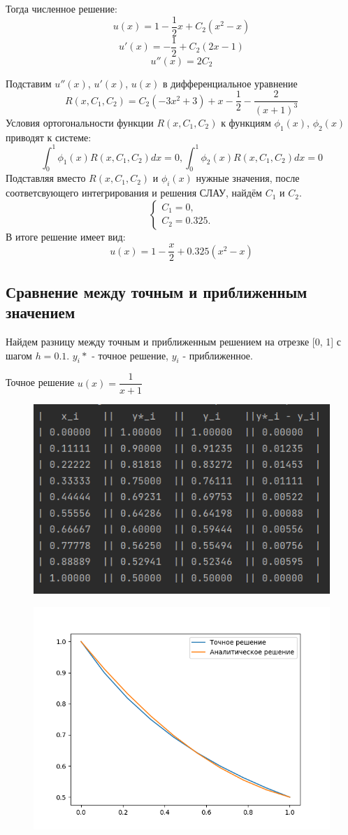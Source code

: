 \documentclass[a4paper, 14pt, fleqn]{extarticle}
\begin{document}
				Тогда численное решение: 
				\[ u(x) = 1 - \dfrac{1}{2}x + C_2(x^2-x) \]
				\[u'(x) = -\dfrac{1}{2} + C_2(2x-1) \]
				\[u''(x) = 2C_2\]
				
				Подставим $u''(x)$, $u'(x)$, $u(x)$ в дифференциальное уравнение
				\[ R(x, C_1, C_2) = C_2(-3x^2+3) + x - \dfrac{1}{2} - \dfrac{2}{(x+1)^3} \]
				Условия ортогональности функции $R(x, C_1, C_2	)$ к функциям $\phi_1(x)$, 
				$\phi_2(x)$ приводят к системе:
				\[ \int_{0}^{1} \phi_1(x)R(x, C_1, C_2)dx = 0, 
				\int_{0}^{1} \phi_2(x)R(x, C_1, C_2)dx = 0 \]
				Подставляя вместо $R(x, C_1, C_2)$ и $\phi_i(x)$ нужные значения, после
				соответсвующего интегрирования и решения СЛАУ, найдём $C_1$ и $C_2$.
				\begin{equation*}
					\begin{cases}
						C_1 = 0 , \\
						C_2 = 0.325.
					\end{cases}
				\end{equation*}
				В итоге решение имеет вид:
				\[ u(x) = 1 - \dfrac{x}{2} + 0.325(x^2-x) \]
				
			\subsection{Сравнение между точным и приближенным значением}
				 Найдем разницу между точным и приближенным решением на отрезке [0, 1] с шагом
				 $h = 0.1$. $y_i*$ - точное решение, $y_i$ - приближенное.
				 
				 Точное решение $u(x) = \dfrac{1}{x+1} $
				 
 				\begin{figure}[h]
				 	\centering
				 	\includegraphics[width = 0.7\linewidth]{table.png}
				\end{figure}
				\pagebreak
				\begin{figure}[h]
					\centering
					\includegraphics[width = 0.9\linewidth]{plot.png}
				\end{figure}
\end{document}

